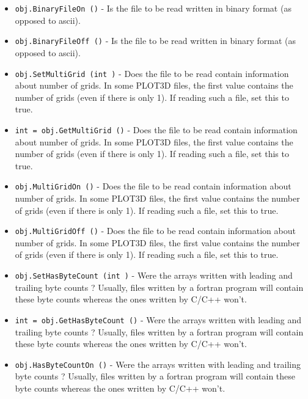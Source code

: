 \begin{itemize}
\item  \verb|obj.BinaryFileOn ()| -  Is the file to be read written in binary format (as opposed
 to ascii).

\item  \verb|obj.BinaryFileOff ()| -  Is the file to be read written in binary format (as opposed
 to ascii).

\item  \verb|obj.SetMultiGrid (int )| -  Does the file to be read contain information about number of
 grids. In some PLOT3D files, the first value contains the number 
 of grids (even if there is only 1). If reading such a file,
 set this to true.

\item  \verb|int = obj.GetMultiGrid ()| -  Does the file to be read contain information about number of
 grids. In some PLOT3D files, the first value contains the number 
 of grids (even if there is only 1). If reading such a file,
 set this to true.

\item  \verb|obj.MultiGridOn ()| -  Does the file to be read contain information about number of
 grids. In some PLOT3D files, the first value contains the number 
 of grids (even if there is only 1). If reading such a file,
 set this to true.

\item  \verb|obj.MultiGridOff ()| -  Does the file to be read contain information about number of
 grids. In some PLOT3D files, the first value contains the number 
 of grids (even if there is only 1). If reading such a file,
 set this to true.

\item  \verb|obj.SetHasByteCount (int )| -  Were the arrays written with leading and trailing byte counts ?
 Usually, files written by a fortran program will contain these
 byte counts whereas the ones written by C/C++ won't.

\item  \verb|int = obj.GetHasByteCount ()| -  Were the arrays written with leading and trailing byte counts ?
 Usually, files written by a fortran program will contain these
 byte counts whereas the ones written by C/C++ won't.

\item  \verb|obj.HasByteCountOn ()| -  Were the arrays written with leading and trailing byte counts ?
 Usually, files written by a fortran program will contain these
 byte counts whereas the ones written by C/C++ won't.


\end{itemize}
